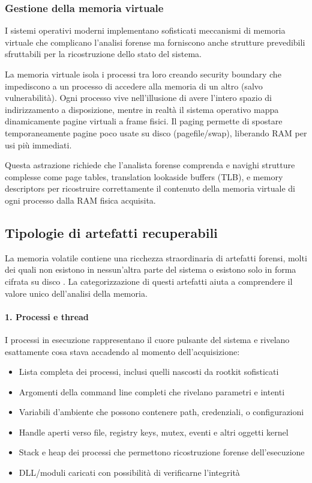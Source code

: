 \subsubsection{Gestione della memoria virtuale}
I sistemi operativi moderni implementano sofisticati meccanismi di memoria virtuale che complicano l'analisi forense ma forniscono anche strutture prevedibili sfruttabili per la ricostruzione dello stato del sistema.

La memoria virtuale isola i processi tra loro creando security boundary che impediscono a un processo di accedere alla memoria di un altro (salvo vulnerabilità). Ogni processo vive nell'illusione di avere l'intero spazio di indirizzamento a disposizione, mentre in realtà il sistema operativo mappa dinamicamente pagine virtuali a frame fisici. Il paging permette di spostare temporaneamente pagine poco usate su disco (pagefile/swap), liberando RAM per usi più immediati.

Questa astrazione richiede che l'analista forense comprenda e navighi strutture complesse come page tables, translation lookaside buffers (TLB), e memory descriptors per ricostruire correttamente il contenuto della memoria virtuale di ogni processo dalla RAM fisica acquisita.

\subsection{Tipologie di artefatti recuperabili}

La memoria volatile contiene una ricchezza straordinaria di artefatti forensi, molti dei quali non esistono in nessun'altra parte del sistema o esistono solo in forma cifrata su disco \cite{case2017}. La categorizzazione di questi artefatti aiuta a comprendere il valore unico dell'analisi della memoria.

\paragraph{1. Processi e thread}
I processi in esecuzione rappresentano il cuore pulsante del sistema e rivelano esattamente cosa stava accadendo al momento dell'acquisizione:
\begin{itemize}
    \item Lista completa dei processi, inclusi quelli nascosti da rootkit sofisticati
    \item Argomenti della command line completi che rivelano parametri e intenti
    \item Variabili d'ambiente che possono contenere path, credenziali, o configurazioni
    \item Handle aperti verso file, registry keys, mutex, eventi e altri oggetti kernel
    \item Stack e heap dei processi che permettono ricostruzione forense dell'esecuzione
    \item DLL/moduli caricati con possibilità di verificarne l'integrità
\end{itemize}

